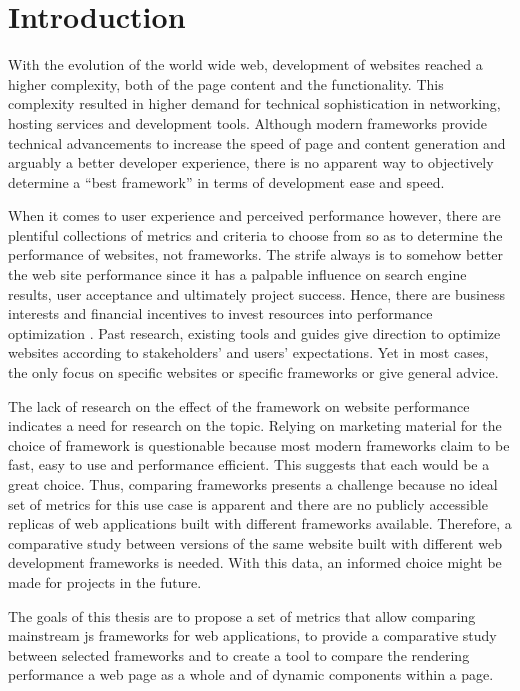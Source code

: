 \documentclass[a4paper, 12pt]{article}
\begin{document}

\section{Introduction}

With the evolution of the world wide web, development of websites reached a higher complexity, both of the page content and the functionality.
This complexity resulted in higher demand for technical sophistication in networking, hosting services and development tools.
Although modern frameworks provide technical advancements to increase the speed of page and content generation and arguably a better developer experience, there is no apparent way to objectively determine a \enquote{best framework} in terms of development ease and speed.

When it comes to user experience and perceived performance however, there are plentiful collections of metrics and criteria to choose from so as to determine the performance of websites, not frameworks.
The strife always is to somehow better the web site performance since it has a palpable influence on search engine results, user acceptance and ultimately project success.
Hence, there are business interests and financial incentives to invest resources into performance optimization \citep{webprophet,effectsofwebpagecontents}.
Past research, existing tools and guides give direction to optimize websites according to stakeholders' and users' expectations.
Yet in most cases, the only focus on specific websites or specific frameworks or give general advice.

The lack of research on the effect of the framework on website performance indicates a need for research on the topic.
Relying on marketing material for the choice of framework is questionable because most modern frameworks claim to be fast, easy to use and performance efficient.
This suggests that each would be a great choice.
Thus, comparing frameworks presents a challenge because no ideal set of metrics for this use case is apparent and there are no publicly accessible replicas of web applications built with different frameworks available.
Therefore, a comparative study between versions of the same website built with different web development frameworks is needed.
With this data, an informed choice might be made for projects in the future.

The goals of this thesis are to propose a set of metrics that allow comparing mainstream \acrfull{js} frameworks for web applications, to provide a comparative study between selected frameworks and to create a tool to compare the rendering performance a web page as a whole and of dynamic components within a page.
\end{document}
